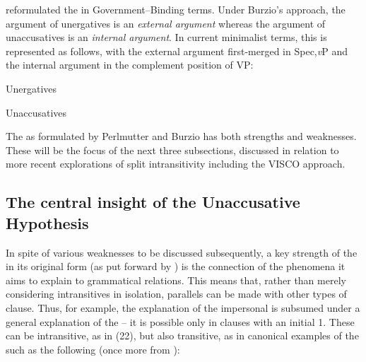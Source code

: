 \documentclass[output=paper]{langsci/langscibook}
\begin{document}
\textcite{Burzio1981,Burzio1986} reformulated the  in
Government--Binding terms. Under Burzio’s approach, the argument of unergatives
is an \emph{external argument} whereas the argument of unaccusatives is an
\emph{internal argument}. In current minimalist terms, this is represented as
follows, with the external argument first-merged in Spec,\emph{v}P and the
internal argument in the complement position of VP:

\begin{multicols}{2}
\ea
    \ea Unergatives\\
    \ex Unaccusatives\\
    \z
\z
\end{multicols}

\noindent The  as formulated by Perlmutter and
Burzio has both strengths and weaknesses. These will be the focus of the next
three subsections, discussed in relation to more recent explorations of split
intransitivity including the VISCO approach.

\subsection{The central insight of the Unaccusative Hypothesis}

In spite of various weaknesses to be discussed subsequently, a key strength of
the  in its original form (as put forward by
\citealt{Perlmutter1978}) is the connection of the phenomena it aims to explain
to grammatical relations. This means that, rather than merely considering
intransitives in isolation, parallels can be made with other types of clause.
Thus, for example, the explanation of the impersonal  is subsumed under
a general explanation of the  – it is possible only in clauses with an
initial 1. These can be intransitive, as in (22), but also transitive, as in
canonical examples of the  such as the following (once more from ):
\end{document}
